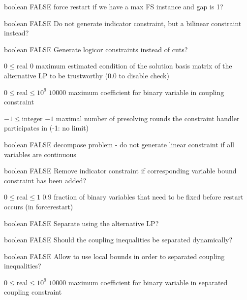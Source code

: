 %
{boolean}%
{FALSE}%
{force restart if we have a max FS instance and gap is 1?}%
{}

%
{boolean}%
{FALSE}%
{Do not generate indicator constraint, but a bilinear constraint instead?}%
{}

%
{boolean}%
{FALSE}%
{Generate logicor constraints instead of cuts?}%
{}

%
{$0\leq\textrm{real}$}%
{$0$}%
{maximum estimated condition of the solution basis matrix of the alternative LP to be trustworthy (0.0 to disable check)}%
{}

%
{$0\leq\textrm{real}\leq10^{  9}$}%
{$10000$}%
{maximum coefficient for binary variable in coupling constraint}%
{}

%
{$-1\leq\textrm{integer}$}%
{$-1$}%
{maximal number of presolving rounds the constraint handler participates in (-1: no limit)}%
{}

%
{boolean}%
{FALSE}%
{decompose problem - do not generate linear constraint if all variables are continuous}%
{}

%
{boolean}%
{FALSE}%
{Remove indicator constraint if corresponding variable bound constraint has been added?}%
{}

%
{$0\leq\textrm{real}\leq1$}%
{$0.9$}%
{fraction of binary variables that need to be fixed before restart occurs (in forcerestart)}%
{}

%
{boolean}%
{FALSE}%
{Separate using the alternative LP?}%
{}

%
{boolean}%
{FALSE}%
{Should the coupling inequalities be separated dynamically?}%
{}

%
{boolean}%
{FALSE}%
{Allow to use local bounds in order to separated coupling inequalities?}%
{}

%
{$0\leq\textrm{real}\leq10^{  9}$}%
{$10000$}%
{maximum coefficient for binary variable in separated coupling constraint}%
{}

